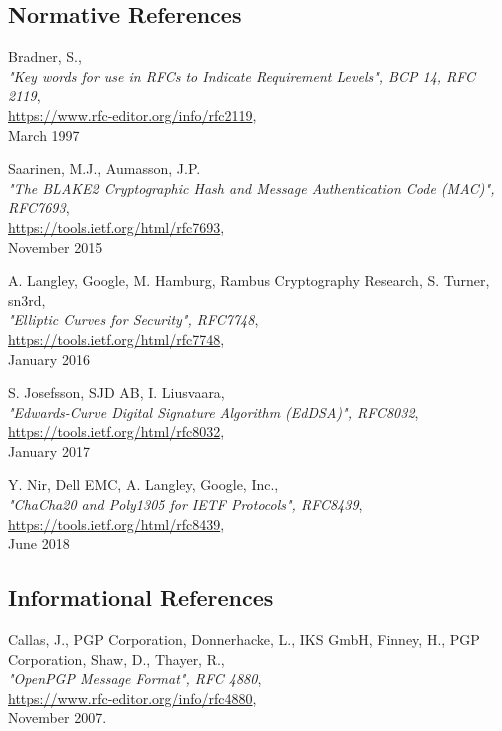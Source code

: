 \documentclass[10pt]{article}
\begin{document}
\begin{thebibliography}{XXXXXXX}

\subsection{Normative References}

  Bradner, S.,\\
  \emph{"Key words for use in RFCs to Indicate Requirement Levels", BCP 14, RFC 2119},\\
  \url{https://www.rfc-editor.org/info/rfc2119},\\
  March 1997

  Saarinen, M.J., Aumasson, J.P.\\
  \emph{"The BLAKE2 Cryptographic Hash and Message Authentication Code (MAC)", RFC7693},\\
  \url{https://tools.ietf.org/html/rfc7693},\\
  November 2015

  A. Langley, Google, M. Hamburg, Rambus Cryptography Research, S. Turner, sn3rd,\\
  \emph{"Elliptic Curves for Security", RFC7748},\\
  \url{https://tools.ietf.org/html/rfc7748},\\
  January 2016

  S. Josefsson, SJD AB, I. Liusvaara,\\
  \emph{"Edwards-Curve Digital Signature Algorithm (EdDSA)", RFC8032},\\
  \url{https://tools.ietf.org/html/rfc8032},\\
  January 2017

  Y. Nir, Dell EMC, A. Langley, Google, Inc.,\\
  \emph{"ChaCha20 and Poly1305 for IETF Protocols", RFC8439},\\
  \url{https://tools.ietf.org/html/rfc8439},\\
  June 2018

\subsection{Informational References}

  Callas, J., PGP Corporation, Donnerhacke, L., IKS GmbH, Finney, H., PGP Corporation, Shaw, D., Thayer, R.,\\
  \emph{"OpenPGP Message Format", RFC 4880},\\
  \url{https://www.rfc-editor.org/info/rfc4880},\\
  November 2007.


\end{thebibliography}
\end{document}
